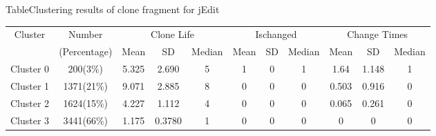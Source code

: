 \begin{table}[htbp]
{Table$\!$}{Clustering results of clone fragment for jEdit}
\vspace{0.5em}
\centering
\footnotesize
\begin{tabular}{ccccccccccc}
\toprule[1.5pt]
\multirow{2}{*}{Cluster}&{Number}&\multicolumn{3}{c}{Clone Life}&\multicolumn{3}{c}{Ischanged}&\multicolumn{3}{c}{Change Times} \\
&(Percentage)&{Mean}&SD &{Median}&{Mean}&SD&{Median}&{Mean}&SD &{Median}\\
\midrule[1pt]
Cluster 0&200(3\%)&5.325&2.690&5&1	&0	&1	&1.64	&1.148&1\\ 
Cluster 1&1371(21\%)	&9.071&2.885&8	&0	&0	&0	&0.503&0.916&0\\ 
Cluster 2&	1624(15\%)	&4.227&1.112&4	&0	&0	&0	&0.065&0.261&0\\ 
Cluster 3&	3441(66\%)	&1.175	&0.3780&1	&0	&0	&0	&0	&0	&0\\ 
\bottomrule[1.5pt]
\end{tabular}
\end{table}

